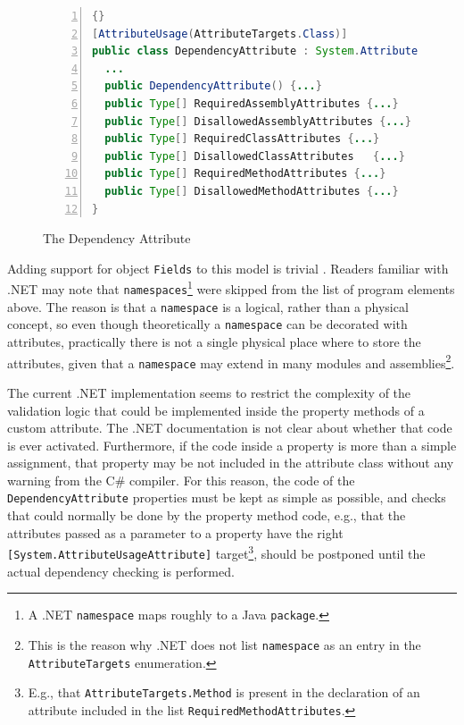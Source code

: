 \begin{figure}[ht]
\begin{center}
\begin{minipage}{10cm}
\begin{scriptsize}
\begin{lstlisting}[numbers=left,language=Java,frame=leftline]{}
[AttributeUsage(AttributeTargets.Class)]
public class DependencyAttribute : System.Attribute {
  ...
  public DependencyAttribute() {...}
  public Type[] RequiredAssemblyAttributes {...}
  public Type[] DisallowedAssemblyAttributes {...}
  public Type[] RequiredClassAttributes {...}
  public Type[] DisallowedClassAttributes	{...}
  public Type[] RequiredMethodAttributes {...}
  public Type[] DisallowedMethodAttributes {...}
}
\end{lstlisting}
\end{scriptsize}
\end{minipage}
\end{center}
\caption{The Dependency Attribute}
\label{fig:da}
\end{figure}

Adding support for object \texttt{Fields} to this model is trivial . Readers familiar with .NET may note that \texttt{na\-me\-spa\-ces}\footnote{A .NET \texttt{na\-me\-spa\-ce} maps roughly to a Java  \texttt{package}.} were skipped from the list of program elements above. The reason is that a \texttt{na\-me\-spa\-ce} is a logical, rather than a physical concept, so even though theoretically a \texttt{na\-me\-spa\-ce} can be decorated with attributes, practically there is not a single physical place where to store the attributes, given that a \texttt{na\-me\-spa\-ce} may extend in many modules and assemblies\footnote{This is the reason why .NET does not list \texttt{na\-me\-spa\-ce} as an entry in the \texttt{Attri\-bu\-te\-Tar\-gets} enumeration.}.

The current .NET implementation seems to restrict the complexity of the validation logic that could be implemented inside the property methods of a custom attribute. 
The .NET documentation is not clear about whether that code is ever activated. Furthermore, if the code inside a property is more than a simple assignment, that property may be not included in the attribute class without any warning from the C\# compiler.
For this reason, the code of the \texttt{De\-pen\-den\-cy\-Attri\-bu\-te} properties must be kept as simple as possible, and checks that could normally be done by the property method code, e.g., that the attributes passed as a parameter to a property have the right \texttt{[Sy\-stem.Attri\-bu\-te\-Usa\-ge\-Attri\-bu\-te]} target\footnote{E.g., that \texttt{Attri\-bu\-te\-Tar\-gets.\-Me\-thod} is present in the declaration of an attribute included in the list \texttt{Re\-qui\-red\-Me\-thod\-Attri\-bu\-tes}.}, should be postponed until the actual dependency checking is performed.

